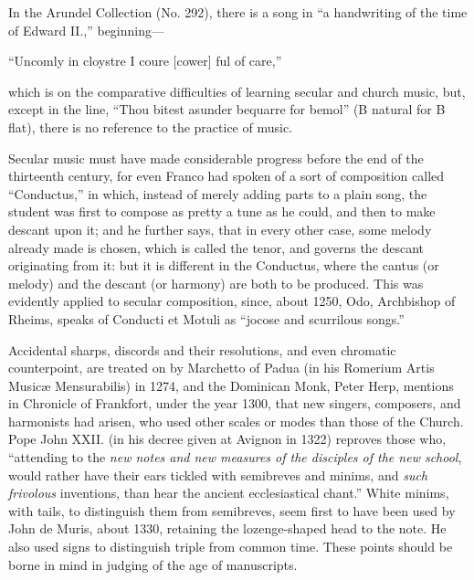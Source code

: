 \renewcommand\versoheader{national songs not on church scales.}
\renewcommand\rectoheader{church music always in arrear.}



In the Arundel Collection (No. 292), there is a song in “a handwriting of
the time of Edward II.,” beginning—
\settowidth{\versewidth}{“Uncomly in cloystre I coure [cower] ful of care,”}
\begin{scverse}
“Uncomly in cloystre I coure [cower] ful of care,”
\end{scverse}
which is on the comparative difficulties of learning secular and church music,
but, except in the line, “Thou bitest asunder bequarre for bemol” (B natural
for B flat), there is no reference to the practice of music.

Secular music must have made considerable progress before the end of the
thirteenth century, for even Franco had spoken of a sort of composition called
“Conductus,” in which, instead of merely adding parts to a plain song, the student
was first to compose as pretty a tune as he could, and then to make descant
upon it; %
and he further says, that in every other case, some melody already made
is chosen, which is called the tenor, and governs the descant originating from it:
but it is different in the Conductus, where the cantus (or melody) and the descant
(or harmony) are both to be produced. This was evidently applied to secular
composition, since, about 1250, Odo, Archbishop of Rheims, speaks of Conducti et
Motuli as “jocose and scurrilous songs.”

Accidental sharps, discords and their resolutions, and even chromatic counterpoint,
are treated on by Marchetto of Padua (in his Romerium Artis Musicæ
Mensurabilis) in 1274, and the Dominican Monk, Peter Herp, mentions in
Chronicle of Frankfort, under the year 1300, that new singers, composers, and
harmonists had arisen, who used other scales or modes than those of the Church. %
Pope John XXII. (in his decree given at Avignon in 1322) reproves those who,
“attending to the \textit{new notes and new measures of the disciples of the new school},
would rather have their ears tickled with semibreves and minims, and \textit{such frivolous}
inventions, than hear the ancient ecclesiastical chant.” White minims, with tails,
to distinguish them from semibreves, seem first to have been used by John de
Muris, about 1330, retaining the lozenge-shaped head to the note. He also used
signs to distinguish triple from common time. These points should be borne in
mind in judging of the age of manuscripts.

